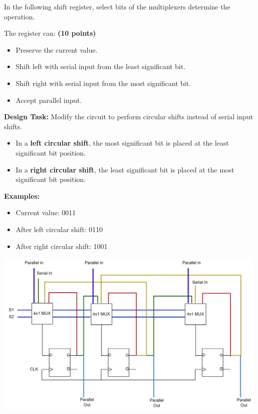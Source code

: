 \documentclass[10pt,answers]{exam}
\newcommand{\qpoints}[1]{\hfill \textbf{(#1 points)}}
\begin{document}
\begin{questions}
\question In the following shift register, select bits of the multiplexers determine the operation. 

The register can: \qpoints{10}

\begin{itemize}
    \item Preserve the current value.
    \item Shift left with serial input from the least significant bit.
    \item Shift right with serial input from the most significant bit.
    \item Accept parallel input.
\end{itemize}

\textbf{Design Task:} Modify the circuit to perform circular shifts instead of serial input shifts. 
\begin{itemize}
    \item In a \textbf{left circular shift}, the most significant bit is placed at the least significant bit position.
    \item In a \textbf{right circular shift}, the least significant bit is placed at the most significant bit position.
\end{itemize}

\textbf{Examples:}
\begin{itemize}
    \item Current value: 0011
    \item After left circular shift: 0110
    \item After right circular shift: 1001
\end{itemize}

\begin{center}
    \includegraphics[width=0.75\linewidth]{images/ex6.png}
\end{center}


\end{questions}
\end{document}
